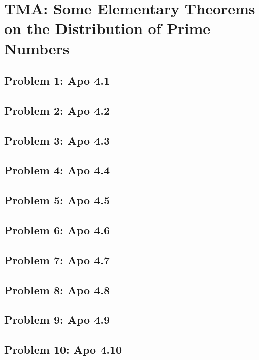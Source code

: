 \section{TMA: Some Elementary Theorems on the Distribution of Prime Numbers}

\subsection[Problem 1]{Problem 1: Apo 4.1}

\subsection[Problem 2]{Problem 2: Apo 4.2}

\subsection[Problem 3]{Problem 3: Apo 4.3}

\subsection[Problem 4]{Problem 4: Apo 4.4}

\subsection[Problem 5]{Problem 5: Apo 4.5}

\subsection[Problem 6]{Problem 6: Apo 4.6}

\subsection[Problem 7]{Problem 7: Apo 4.7}

\subsection[Problem 8]{Problem 8: Apo 4.8}

\subsection[Problem 9]{Problem 9: Apo 4.9}

\subsection[Problem 10]{Problem 10: Apo 4.10}